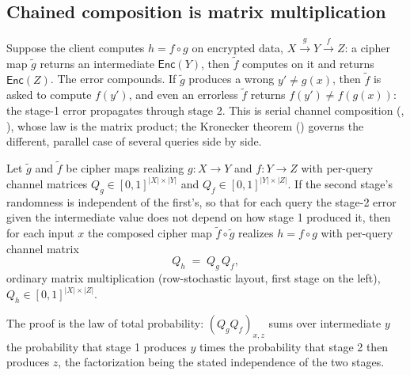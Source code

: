 \subsection*{Chained composition is matrix multiplication}

Suppose the client computes $h = f \circ g$ on encrypted data, $X
\xrightarrow{g} Y \xrightarrow{f} Z$: a cipher map $\tilde g$ returns an
intermediate $\mathsf{Enc}(Y)$, then $\tilde f$ computes on it and
returns $\mathsf{Enc}(Z)$. The error compounds. If $\tilde g$ produces a
wrong $y' \ne g(x)$, then $\tilde f$ is asked to compute $f(y')$, and
even an errorless $\tilde f$ returns $f(y') \ne f(g(x))$: the stage-1
error propagates through stage 2. This is serial channel composition
(, ), whose
law is the matrix product; the Kronecker theorem ()
governs the different, parallel case of several queries side by side.

\begin{theorem}
\label{thm:cipher-composition}
Let $\tilde g$ and $\tilde f$ be cipher maps realizing $g : X \to Y$ and
$f : Y \to Z$ with per-query channel matrices $Q_g \in [0,1]^{|X| \times
|Y|}$ and $Q_f \in [0,1]^{|Y| \times |Z|}$. If the second stage's randomness is independent of the first's, so that
for each query the stage-2 error given the intermediate value does not
depend on how stage 1 produced it, then for each input $x$ the composed
cipher map $\tilde f \circ \tilde g$ realizes $h = f \circ g$ with
per-query channel matrix
\[
  Q_h \;=\; Q_g \, Q_f,
\]
ordinary matrix multiplication (row-stochastic layout, first stage on
the left), $Q_h \in [0,1]^{|X| \times |Z|}$.
\end{theorem}

The proof is the law of total probability: $(Q_g Q_f)_{x,z}$ sums over
intermediate $y$ the probability that stage 1 produces $y$ times the
probability that stage 2 then produces $z$, the factorization being the
stated independence of the two stages.

